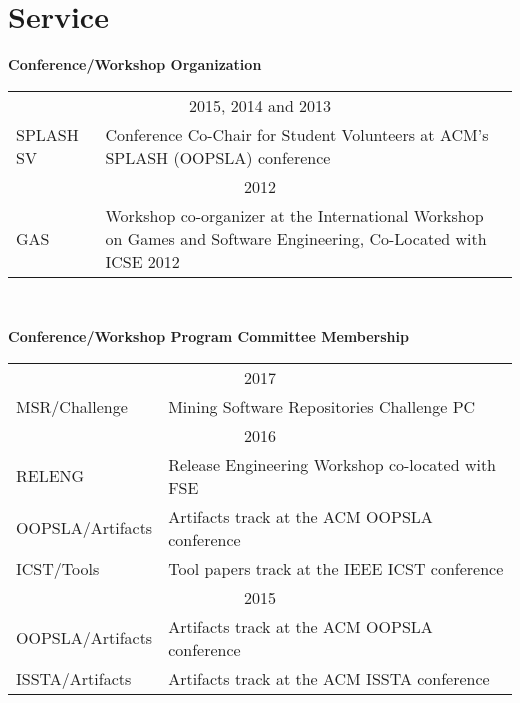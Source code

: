 \documentclass[10pt]{article}
\begin{document}
\begin{comment}
\halfblankline

\href{http://www.sikorsky.com/}{\textbf{Sikorsky Aircraft}},
New York, NY%
\begin{outerlist}

\item[] \textit{Intern, Operations Analysis}%
        \hfill \textbf{May 2007 to August 2007}
\begin{innerlist}\vspace{-4pt}
\item Lead programmer in a team creating a simulator for natural and terrorist disaster response
\end{innerlist}
\end{outerlist}
\end{comment}




\vspace{-8pt}
\section{Service}
\textbf{Conference/Workshop Organization} \\
\vspace{-10pt}
\noindent\begin{tabular}{p{2.5cm}p{10.5cm}}
\multicolumn{2}{c}{2015, 2014 and 2013}\\
SPLASH SV&Conference Co-Chair for Student Volunteers at ACM's SPLASH (OOPSLA) conference\\
\multicolumn{2}{c}{2012}\\
GAS & Workshop co-organizer at the International Workshop on Games and Software Engineering, Co-Located with ICSE 2012
\end{tabular}\\
\vspace{10pt}

\textbf{Conference/Workshop Program Committee Membership} \\
\vspace{-10pt}
\noindent\begin{tabular}{p{3cm}p{9.5cm}}
\multicolumn{2}{c}{2017}\\
MSR/Challenge & Mining Software Repositories Challenge PC\\
\multicolumn{2}{c}{2016}\\
RELENG & Release Engineering Workshop co-located with FSE\\
OOPSLA/Artifacts &Artifacts track at the ACM OOPSLA conference\\
ICST/Tools & Tool papers track at the IEEE ICST conference\\
\multicolumn{2}{c}{2015}\\
OOPSLA/Artifacts &Artifacts track at the ACM OOPSLA conference\\
ISSTA/Artifacts &Artifacts track at the ACM ISSTA conference\\

\end{tabular}\\
\vspace{10pt}
\end{document}
